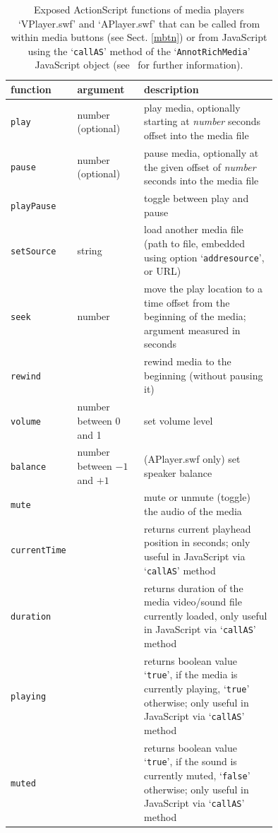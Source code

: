 \documentclass[a4paper]{article}
\begin{document}
\begin{table}%
\centering
\caption{Exposed ActionScript functions of media players `VPlayer.swf' and `APlayer.swf' that can be called from within media buttons (see Sect. \ref{mbtn}) or from JavaScript using the `{\tt callAS}' method of the `{\tt AnnotRichMedia}' JavaScript object (see~\cite{jscript} for further information).}\label{AVPlayerMethods}
\begin{tabular}[t]{lp{0.25\linewidth}p{0.5\linewidth}}\hline
function & argument &description\\\hline\hline
{\tt play}       & number (optional)      & play media, optionally starting at \emph{number} seconds offset into the media file\\
{\tt pause}      & number (optional)      & pause media, optionally at the given offset of \emph{number} seconds into the media file\\
{\tt playPause}  &                        & toggle between play and pause\\
{\tt setSource}  & string                 & load another media file (path to file, embedded using option `{\tt addresource}', or URL)\\
{\tt seek}       & number                 & move the play location to a time offset from the beginning of the media; argument measured in seconds\\
{\tt rewind}     &                        & rewind media to the beginning (without pausing it)\\
{\tt volume}     & number between 0 and 1 & set volume level\\
{\tt balance}    & number between $-1$ and $+1$ & (APlayer.swf only) set speaker balance\\
{\tt mute}       &                        & mute or unmute (toggle) the audio of the media\\
{\tt currentTime}&                        & returns current playhead position in seconds; only useful in JavaScript via `{\tt callAS}' method\\
{\tt duration}   &                        & returns duration of the media video/sound file currently loaded, only useful in JavaScript via `{\tt callAS}' method\\
{\tt playing}    &                        & returns boolean value `{\tt true}', if the media is currently playing, `{\tt true}' otherwise; only useful in JavaScript via `{\tt callAS}' method\\
{\tt muted}      &                        & returns boolean value `{\tt true}', if the sound is currently muted, `{\tt false}' otherwise; only useful in JavaScript via `{\tt callAS}' method\\\hline
\end{tabular}
\end{table}
\end{document}
